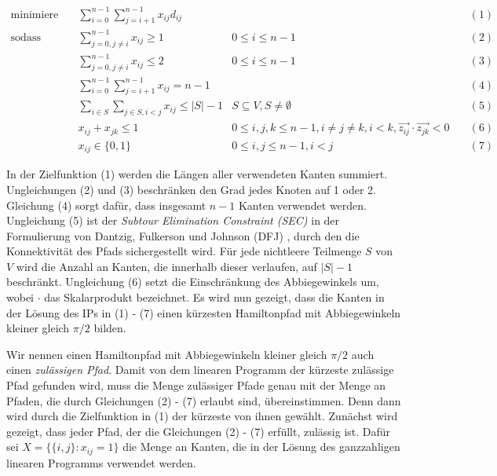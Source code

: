 \documentclass[a4paper, 10pt, ngerman]{article}
\begin{document}
\begin{align*}
    \text{minimiere} \quad & \sum_{i = 0}^{n - 1} \sum_{j = i + 1}^{n - 1} x_{ij} d_{ij} & & \quad (1) \\
    \text{sodass} \quad 
    & \sum_{j = 0, j \ne i}^{n - 1} x_{ij} \ge 1 & 0 \le i \le n - 1 & \quad (2) \\
    & \sum_{j = 0, j \ne i}^{n - 1} x_{ij} \le 2 & 0 \le i \le n - 1 & \quad (3) \\
    & \sum_{i = 0}^{n - 1} \sum_{j = i + 1}^{n - 1} x_{ij} = n - 1 & & \quad (4) \\
    & \sum_{i \in S} \sum_{j \in S, i < j} x_{ij} \le |S| - 1 & S \subseteq V, S \ne \emptyset & \quad (5) \\
    & x_{ij} + x_{jk} \le 1 & 0 \le i, j, k \le n - 1, i \ne j \ne k, i < k, \vec{z_{ij}} \cdot \vec{z_{jk}} < 0 & \quad (6) \\
    & x_{ij} \in \{0, 1\} & 0 \le i, j \le n - 1, i < j & \quad (7)
\end{align*}
\smallskip

In der Zielfunktion (1) werden die Längen aller verwendeten Kanten summiert. Ungleichungen (2) und (3) beschränken den Grad jedes Knoten auf 1 oder 2. Gleichung (4) sorgt dafür, dass insgesamt $n - 1$ Kanten verwendet werden. Ungleichung (5) ist der \emph{Subtour Elimination Constraint (SEC)} in der Formulierung von Dantzig, Fulkerson und Johnson (DFJ) \cite{tsp-formulations}, durch den die Konnektivität des Pfads sichergestellt wird. Für jede nichtleere Teilmenge $S$ von $V$ wird die Anzahl an Kanten, die innerhalb dieser verlaufen, auf $|S| - 1$ beschränkt. Ungleichung (6) setzt die Einschränkung des Abbiegewinkels um, wobei $\cdot$ das Skalarprodukt bezeichnet. Es wird nun gezeigt, dass die Kanten in der Lösung des IPs in (1) - (7) einen kürzesten Hamiltonpfad mit Abbiegewinkeln kleiner gleich $\pi / 2$ bilden. 

Wir nennen einen Hamiltonpfad mit Abbiegewinkeln kleiner gleich $\pi / 2$ auch einen \emph{zulässigen Pfad}. Damit von dem linearen Programm der kürzeste zulässige Pfad gefunden wird, muss die Menge zulässiger Pfade genau mit der Menge an Pfaden, die durch Gleichungen (2) - (7) erlaubt sind, übereinstimmen. Denn dann wird durch die Zielfunktion in (1) der kürzeste von ihnen gewählt. Zunächst wird gezeigt, dass jeder Pfad, der die Gleichungen (2) - (7) erfüllt, zulässig ist. Dafür sei $X = \{\{i, j\} : x_{ij} = 1\}$ die Menge an Kanten, die in der Lösung des ganzzahligen linearen Programms verwendet werden.
\end{document}
